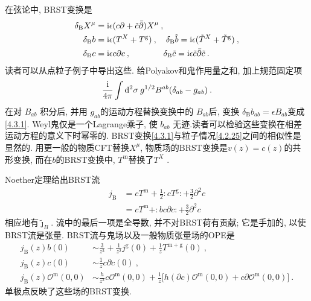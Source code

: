 在弦论中, BRST变换是
\begin{subequations}\label{4.3.1}
\begin{align}
\delta_{\mathrm{B}} X^{\mu} &= \mathrm{i} \epsilon(c \partial+\tilde{c} \bar{\partial}) X^{\mu} \:, \label{4.3.1a} \\
\delta_{\mathrm{B}} b &= \mathrm{i} \epsilon(T^{X}+T^{\mathrm{g}}) \:, \quad 
\delta_{\mathrm{B}} \tilde{b}=\mathrm{i} \epsilon(\tilde{T}^{X}+\tilde{T}^{\mathrm{g}}) \:, \label{4.3.1b} \\
\delta_{\mathrm{B}} c &= \mathrm{i} \epsilon c \partial c \:, \qquad \quad \:\:\:\:\delta_{\mathrm{B}} \tilde{c}=\mathrm{i} \epsilon \tilde{c} \bar{\partial} \tilde{c} \:.
\label{4.3.1c}
\end{align}
\end{subequations}
读者可以从点粒子例子中导出这些. 给Polyakov和鬼作用量之和, 加上规范固定项
\begin{equation}
\frac{\mathrm{i}}{4 \pi} \int \mathrm{d}^{2} \sigma \: g^{1 / 2} B^{a b}(\delta_{a b}-g_{a b}) \:. \label{4.3.2}
\end{equation}
在对 $B_{a b}$ 积分后, 并用 $g_{a b}$的运动方程替换变换中的 $B_{a b}$后, 变换 $\delta_{\mathrm{B}} b_{a b}=\epsilon B_{a b}$变成\eqref{4.3.1}. Weyl鬼仅是一个Lagrange乘子, 使 $b_{a b}$ 无迹.读者可以检验这些变换在相差运动方程的意义下时幂零的. BRST变换\eqref{4.3.1}与粒子情况\eqref{4.2.25}之间的相似性是显然的. 
用更一般的物质CFT替换$X^{\mu}$, 物质场的BRST变换是$v(z)=c(z)$的共形变换, 而在$b$的BRST变换中, $T^{\mathrm{m}}$替换了$T^{X}$ .

Noether定理给出BRST流
\begin{align}
j_{\mathrm{B}} &=c T^{\mathrm{m}}+\frac{1}{2}: \mathrel{c T^{\mathrm{g}}}:+\frac{3}{2} \partial^{2} c \nonumber \\
&=c T^{\mathrm{m}}+: \mathrel {b c \partial c}:+\frac{3}{2} \partial^{2} c \label{4.3.3}
\end{align}
相应地有$\tilde{\jmath}_B$. 流中的最后一项是全导数, 并不对BRST荷有贡献; 它是手加的, 以使BRST流是张量. BRST流与鬼场以及一般物质张量场的OPE是
\begin{subequations} \label{4.3.4}
\begin{align}
j_{\mathrm{B}}(z) b(0) &\sim \frac{3}{z^{3}}+\frac{1}{z^{2}} j^{\mathrm{g}}(0)+\frac{1}{z} T^{\mathrm{m}+\mathrm{g}}(0)\:, \label{4.3.4a} \\
j_{\mathrm{B}}(z) c(0) &\sim \frac{1}{z} c \partial c(0) \:, \label{4.3.4b} \\ 
j_{\mathrm{B}}(z) \mathcal{O}^{\mathrm{m}}(0,0) &\sim \frac{h}{z^{2}} c \mathcal{O}^{\mathrm{m}}(0,0)+\frac{1}{z}\bigl[h(\partial c) \mathcal{O}^{\mathrm{m}}(0,0)+c \partial \mathcal{O}^{\mathrm{m}}(0,0)\bigr] \:. \label{4.3.4c}
\end{align}
\end{subequations}
单极点反映了这些场的BRST变换.

